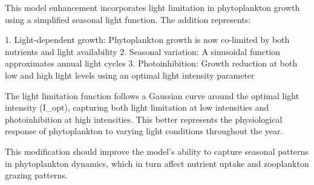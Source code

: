 This model enhancement incorporates light limitation in phytoplankton growth using a simplified seasonal light function. The addition represents:

1. Light-dependent growth: Phytoplankton growth is now co-limited by both nutrients and light availability
2. Seasonal variation: A sinusoidal function approximates annual light cycles
3. Photoinhibition: Growth reduction at both low and high light levels using an optimal light intensity parameter

The light limitation function follows a Gaussian curve around the optimal light intensity (I_opt), capturing both light limitation at low intensities and photoinhibition at high intensities. This better represents the physiological response of phytoplankton to varying light conditions throughout the year.

This modification should improve the model's ability to capture seasonal patterns in phytoplankton dynamics, which in turn affect nutrient uptake and zooplankton grazing patterns.
